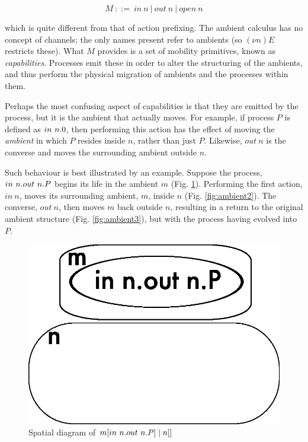 \begin{equation}
\label{ambsyntaxcap}
  M\ ::=\ 
  in\ n\ |\
  out\ n\ | \
  open\ n
\end{equation}

\noindent which is quite different from that of action prefixing.  The
ambient calculus has no concept of channels; the only names present
refer to ambients (so $(\nu n)E$ restricts these).  What $M$ provides
is a set of mobility primitives, known as \emph{capabilities}.
Processes emit these in order to alter the structuring of the
ambients, and thus perform the physical migration of ambients and the
processes within them.

Perhaps the most confusing aspect of capabilities is that they are
emitted by the process, but it is the ambient that actually moves.
For example, if process $P$ is defined as $in\ n.0$, then performing
this action has the effect of moving the \emph{ambient} in which $P$
resides inside $n$, rather than just $P$.  Likewise, $out\ n$ is the
converse and moves the surrounding ambient outside $n$.

Such behaviour is best illustrated by an example. Suppose the process,
$in\ n.out\ n.P$ begins its life in the ambient $m$
(Fig. \ref{fig:ambient1}).  Performing the first action, $in\ n$,
moves its surrounding ambient, $m$, inside $n$
(Fig. \ref{fig:ambient2}).  The converse, $out\ n$, then moves $m$
back outside $n$, resulting in a return to the original ambient
structure (Fig. \ref{fig:ambient3}), but with the process having
evolved into $P$.

\begin{figure}  
  \centering
  \includegraphics[scale=0.3]{ambient1}
  \caption{Spatial diagram of $m[in\ n.out\ n.P] \mid n[]$}
  \label{fig:ambient1}
\end{figure}

